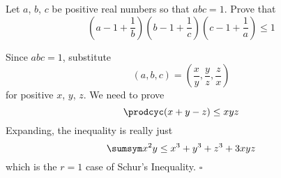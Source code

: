 
\begin{problem}[ISL 2000 A1]
    Let $a$, $b$, $c$ be positive real numbers so that $abc = 1$. Prove that
    \[\left(a - 1 + \frac 1b \right) \left(b - 1 + \frac 1c \right) \left(c - 1 + \frac 1a \right) \leq 1\]
\end{problem}

\begin{solution}
    Since $abc=1$, substitute \[(a, b, c) = \left(\frac xy, \frac yz, \frac zx\right)\] for positive $x$, $y$, $z$. We need to prove \[\prodcyc (x + y - z) \leq xyz\] Expanding, the inequality is really just \[\sumsym x^2y \leq x^3 + y^3 + z^3 + 3xyz\] which is the $r=1$ case of Schur's Inequality. $\square$
\end{solution}

